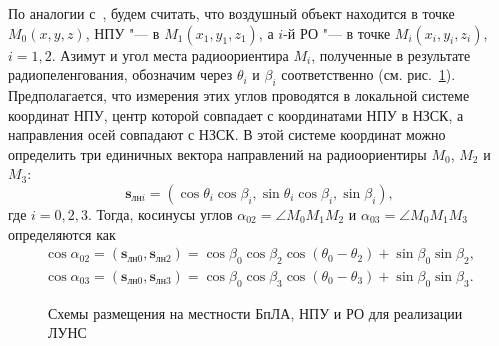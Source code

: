 \documentclass[../main.tex]{subfiles}
\begin{document}
По аналогии с~\cite{antennas}, будем считать, что воздушный объект находится в точке $M_0\left(x, y, z\right)$,
НПУ "--- в $M_1\left(x_1, y_1, z_1\right)$, а $i$-й РО "--- в точке $M_i\left(x_i, y_i, z_i \right)$, $i = 1,2$.
Азимут и угол места радиоориентира $M_i$, полученные в результате радиопеленгования, обозначим через
$\theta_i$ и $\beta_i$ соответственно (см. рис.~\ref{figure:pic1}). Предполагается, что измерения этих
углов проводятся в локальной системе координат НПУ, центр которой совпадает с координатами НПУ в НЗСК, а
направления осей совпадают с НЗСК. В этой системе координат можно определить три единичных вектора направлений
на радиоориентиры $M_0$, $M_2$ и $M_3$:
\begin{equation*}
    \mathbf{s}_{\text{лн}i} = \left(\cos\theta_i \cos\beta_i, \sin\theta_i\cos\beta_i, \sin\beta_i\right),
\end{equation*}
где $i = 0, 2, 3$. Тогда, косинусы углов $\alpha_{02} = \angle M_0 M_1 M_2$ и $\alpha_{03} = \angle M_0 M_1 M_3$
определяются как
\begin{align*}
    \cos\alpha_{02} = \left(\mathbf{s}_{\text{лн}0}, \mathbf{s}_{\text{лн}2}\right) =
    \cos\beta_0 \cos\beta_2 \cos\left(\theta_0 - \theta_2\right) + \sin\beta_0 \sin\beta_2, \\
    \cos\alpha_{03} = \left(\mathbf{s}_{\text{лн}0}, \mathbf{s}_{\text{лн}3}\right) =
    \cos\beta_0 \cos\beta_3 \cos\left(\theta_0 - \theta_3\right) + \sin\beta_0 \sin\beta_3.
\end{align*}

\begin{figure}[htbp]
    \begin{center}


    \caption{Схемы размещения на местности БпЛА, НПУ и РО для реализации ЛУНС}
    \label{figure:pic1}
    \end{center}
\end{figure}
\end{document}
